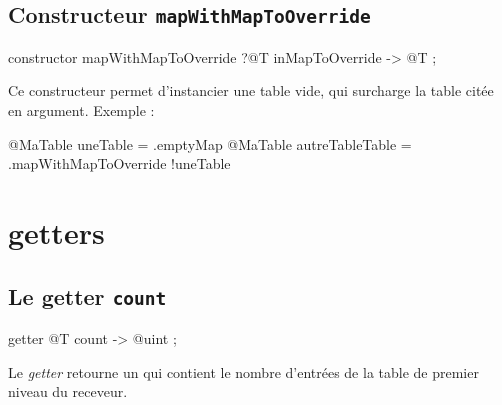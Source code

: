  

\subsection{Constructeur \texttt{mapWithMapToOverride}}

\begin{galgascode}
constructor mapWithMapToOverride ?@T inMapToOverride -> @T ;
\end{galgascode}

Ce constructeur permet d'instancier une table vide, qui surcharge la table  citée en argument. Exemple :
\begin{galgascode}
@MaTable uneTable = .emptyMap
@MaTable autreTableTable = .mapWithMapToOverride {!uneTable}
\end{galgascode}

\section{getters}

%
%

\subsection{Le getter \texttt{count}}

\begin{galgascode}
getter @T count -> @uint ;
\end{galgascode}


Le \emph{getter}  retourne un  qui contient le nombre d'entrées de la table de premier niveau du receveur.



